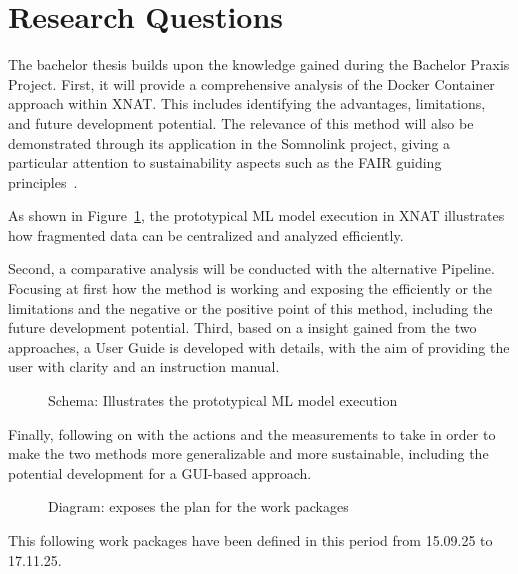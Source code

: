 \section{Research Questions}
The bachelor thesis builds upon the knowledge gained during the Bachelor Praxis Project.
 First, it will provide a comprehensive analysis of the Docker Container approach within XNAT. This includes identifying the advantages, limitations, and future development potential.
 The relevance of this method will also be demonstrated through its application in the Somnolink project, giving a particular attention to sustainability aspects such as the FAIR guiding principles~\cite{wilkinson_fair_2016}.

 As shown in Figure~\ref{fig:diagram-core-libraries}, the prototypical ML model execution in XNAT illustrates how fragmented data can be centralized and analyzed efficiently.

Second, a comparative analysis will be conducted with the alternative Pipeline. Focusing at first how the method is working and exposing the efficiently or the limitations and the negative or the positive point of this method, including the future development potential.  
Third, based on a insight gained from the two approaches, a User Guide is developed with details, with the aim of providing the user with clarity and an instruction manual.

\begin{figure}[H]
  \centering
  \def\svgwidth{0.8\linewidth}
  
  \caption{Schema: Illustrates the prototypical ML model execution }
  \label{fig:diagram-core-libraries}
\end{figure}


Finally, following on with the actions and the measurements to take in order to make the two methods more generalizable and more sustainable, including the potential development for a GUI-based approach.   


\begin{figure}[H]
  \centering
  \def\svgwidth{1.1\linewidth}
  
  \caption{Diagram: exposes the plan for the work packages}
\end{figure}

This following work packages have been defined in this period from 15.09.25 to 17.11.25.
